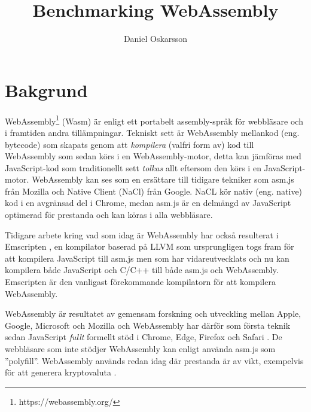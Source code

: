 \documentclass[swedish,template=rapport]{his}
\title{Benchmarking WebAssembly}
\subtitle{}
\author{Daniel Oskarsson}
\begin{document}
\maketitle

\tableofcontents

\clearpage


\section{Bakgrund}

WebAssembly\footnote{https://webassembly.org/} (Wasm) är enligt \textcite{HaasRossbergSchuffTitzerHolmanGohmanWagnerZakaiBastien2017} ett portabelt assembly-språk för webbläsare och i framtiden andra tillämpningar. Tekniskt sett är WebAssembly mellankod (eng. bytecode) som skapats genom att \emph{kompilera} (valfri form av) kod till WebAssembly \parencite{Watt2018} som sedan körs i en WebAssembly-motor, detta kan jämföras med JavaScript-kod som traditionellt sett \emph{tolkas} allt eftersom den körs i en JavaScript-motor. WebAssembly kan ses som en ersättare till tidigare tekniker som asm.js från Mozilla och Native Client (NaCl) från Google. NaCL kör nativ (eng. native) kod i en avgränsad del i Chrome, medan asm.js \parencite{Zakai2018} är en delmängd av JavaScript optimerad för prestanda \parencite{VanEsNicolayStievenartDHondtDeRoover2016} och kan köras i alla webbläsare.

Tidigare arbete kring vad som idag är WebAssembly har också resulterat i Emscripten \parencite{Zakai2011}, en kompilator baserad på LLVM \parencite{LattnerAdve2014} som ursprungligen togs fram för att kompilera JavaScript till asm.js \parencite{Zakai2011} men som har vidareutvecklats \parencite{HaasRossbergSchuffTitzerHolmanGohmanWagnerZakaiBastien2017} och nu kan kompilera både JavaScript och C/C++ till både asm.js och WebAssembly. Emscripten är den vanligast förekommande kompilatorn för att kompilera WebAssembly.

WebAssembly är resultatet av gemensam forskning och utveckling mellan  Apple, Google, Microsoft och Mozilla \parencite{HaasRossbergSchuffTitzerHolmanGohmanWagnerZakaiBastien2017} och WebAssembly har därför som första teknik sedan JavaScript \emph{fullt} formellt stöd i Chrome, Edge, Firefox och Safari \parencite{Moller2018}. De webbläsare som inte stödjer WebAssembly kan enligt \textcite{HaasRossbergSchuffTitzerHolmanGohmanWagnerZakaiBastien2017} använda asm.js  som ''polyfill''. WebAssembly används redan idag där prestanda är av vikt, exempelvis för att generera kryptovaluta \parencite{RuthZimmermannWolsingHohlfeld2018}.
\end{document}

